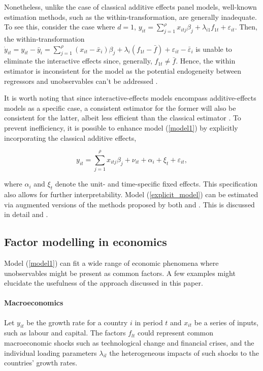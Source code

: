 Nonetheless, unlike the case of classical additive effects panel models, well-known estimation methods, such as the within-transformation, are generally inadequate. To see this, consider the case where $d =1$, $ y_{it} = \sum_{j=1}^\rho x_{itj}\beta_j + \lambda_{i1}f_{1t} + \varepsilon_{it}$. Then, the within-transformation $ \dot{y}_{it}   =   y_{it} - \bar{y}_i = \sum_{j=1}^\rho (x_{it} - \bar{x}_i)\beta_j + \lambda_i(f_{1t} - \bar{f}) + \varepsilon_{it} - \bar{\varepsilon}_{i}$ is unable to eliminate the interactive effects since, generally, $f_{1t} \neq \bar{f}$. Hence, the within estimator is inconsistent for the model as the potential endogeneity between regressors and unobservables can't be addressed \citep{bai2009panel}. 

It is worth noting that since interactive-effects models encompass additive-effects models as a specific case, a consistent estimator for the former will also be consistent for the latter, albeit less efficient than the classical estimator \citep{bai2009panel}. To prevent inefficiency, it is possible to enhance model (\ref{model1}) by explicitly incorporating the classical additive effects,

\begin{equation}\label{explicit_model}
    y_{it} = \sum_{j=1}^\rho x_{itj}\beta_j + \nu_{it} + \alpha_i + \xi_t + \varepsilon_{it},
\end{equation}

where $\alpha_i$ and $\xi_t$ denote the unit- and time-specific fixed effects. This specification also allows for further interpretability. Model (\ref{explicit_model}) can be estimated via augmented versions of the methods proposed by both \citet{bai2009panel} and \citet{kneip2012new}. This is discussed in detail \citet{bai2009panel} and \citet{bada2012phtt}.

\subsection{Factor modelling in economics}

Model (\ref{model1}) can fit a wide range of economic phenomena where unobservables might be present as common factors. A few examples might elucidate the usefulness of the approach discussed in this paper.  

\paragraph{Macroeconomics} Let $y_{it}$ be the growth rate for a country $i$ in period $t$ and $x_{it}$ be a series of inputs, such as labour and capital. The factors $f_{lt}$ could represent common macroeconomic shocks such as technological change and financial crises, and the individual loading parameters $\lambda_{il}$ the heterogeneous impacts of such shocks to the countries' growth rates. 

